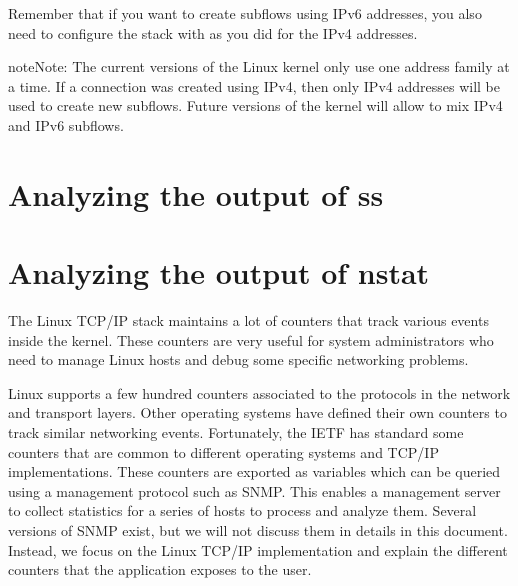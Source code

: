 \documentclass[letterpaper,10pt,english]{sphinxmanual}
\begin{document}
\sphinxAtStartPar
Remember that if you want to create subflows using IPv6 addresses, you also need to configure the stack with  as you did for the IPv4 addresses.

\begin{sphinxadmonition}{note}{Note:}
\sphinxAtStartPar
The current versions of the Linux kernel only use one address family at a time. If a connection was created using IPv4, then only IPv4 addresses will be used to create new subflows. Future versions of the kernel will allow to mix IPv4 and IPv6 subflows.
\end{sphinxadmonition}


\section{Analyzing the output of ss}
\label{\detokenize{mptcp-linux:analyzing-the-output-of-ss}}

\section{Analyzing the output of nstat}
\label{\detokenize{mptcp-linux:analyzing-the-output-of-nstat}}
\sphinxAtStartPar
The Linux TCP/IP stack maintains a lot of counters that track various
events inside the kernel. These counters are very useful for system
administrators who need to manage Linux hosts and debug some specific
networking problems.

\sphinxAtStartPar
Linux supports a few hundred counters associated to the protocols in the
network and transport layers. Other operating systems have defined their
own counters to track similar networking events. Fortunately, the IETF
has standard some counters that are common to different operating
systems and TCP/IP implementations. These counters are exported as
variables which can be queried using a management protocol such as SNMP.
This enables a management server to collect statistics for a series of
hosts to process and analyze them.  Several versions of SNMP exist, but
we will not discuss them in details in this document. Instead, we
focus on the Linux TCP/IP implementation and explain the different counters
that the 
application exposes to the user.
\end{document}
